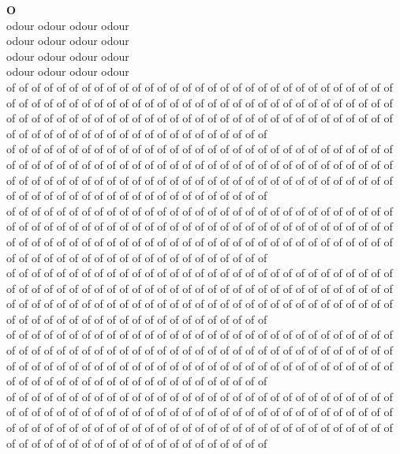 \vspace{14pt}
\noindent\textbf{\Large O}\\[+12pt]
odour odour odour odour\\
odour odour odour odour\\
odour odour odour odour\\
odour odour odour odour\\
of of of of of of of of of of of of of of of of of of of of of of of of of of of of of of of of of of of of of of of of of of of of of of of of of of of of of of of of of of of of of of of of of of of of of of of of of of of of of of of of of of of of of of of of of of of of of of of of of of of of of of of of of of of of of of of of of of\\
of of of of of of of of of of of of of of of of of of of of of of of of of of of of of of of of of of of of of of of of of of of of of of of of of of of of of of of of of of of of of of of of of of of of of of of of of of of of of of of of of of of of of of of of of of of of of of of of of of of of of of of of of of of of of of of of of of\\
of of of of of of of of of of of of of of of of of of of of of of of of of of of of of of of of of of of of of of of of of of of of of of of of of of of of of of of of of of of of of of of of of of of of of of of of of of of of of of of of of of of of of of of of of of of of of of of of of of of of of of of of of of of of of of of of of of\\
of of of of of of of of of of of of of of of of of of of of of of of of of of of of of of of of of of of of of of of of of of of of of of of of of of of of of of of of of of of of of of of of of of of of of of of of of of of of of of of of of of of of of of of of of of of of of of of of of of of of of of of of of of of of of of of of of of\\
of of of of of of of of of of of of of of of of of of of of of of of of of of of of of of of of of of of of of of of of of of of of of of of of of of of of of of of of of of of of of of of of of of of of of of of of of of of of of of of of of of of of of of of of of of of of of of of of of of of of of of of of of of of of of of of of of of\\
of of of of of of of of of of of of of of of of of of of of of of of of of of of of of of of of of of of of of of of of of of of of of of of of of of of of of of of of of of of of of of of of of of of of of of of of of of of of of of of of of of of of of of of of of of of of of of of of of of of of of of of of of of of of of of of of of of\\
